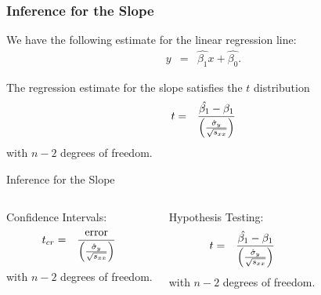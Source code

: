 \begin{frame}
  \frametitle{Inference for the Slope}

  We have the following estimate for the linear regression line:
  \begin{eqnarray*}
    y & = & \hat{\beta_1} x + \hat{\beta_0}.
  \end{eqnarray*}

  \begin{definition}
    The regression estimate for the slope satisfies the $t$ distribution
    \begin{eqnarray*}
      t & = & \frac{\hat{\beta_1}-\beta_1}{\left(\frac{\hat{\sigma}_y}{\sqrt{s_{xx}}}\right)}
    \end{eqnarray*}
    with $n-2$ degrees of freedom.
  \end{definition}

\end{frame}


\begin{frame}{Inference for the Slope}

  \begin{columns}

    Confidence Intervals:
    \begin{eqnarray*}
      t_{cr} & = & \frac{\mathrm{error}}{\left(\frac{\hat{\sigma}_y}{\sqrt{s_{xx}}}\right)}
    \end{eqnarray*}
    with $n-2$ degrees of freedom.


    Hypothesis Testing:
    \begin{eqnarray*}
      t & = & \frac{\hat{\beta_1}-\beta_1}{\left( \frac{\hat{\sigma}_y}{\sqrt{s_{xx}}}\right)}
    \end{eqnarray*}
    with $n-2$ degrees of freedom.

    
  \end{columns}

\end{frame}

